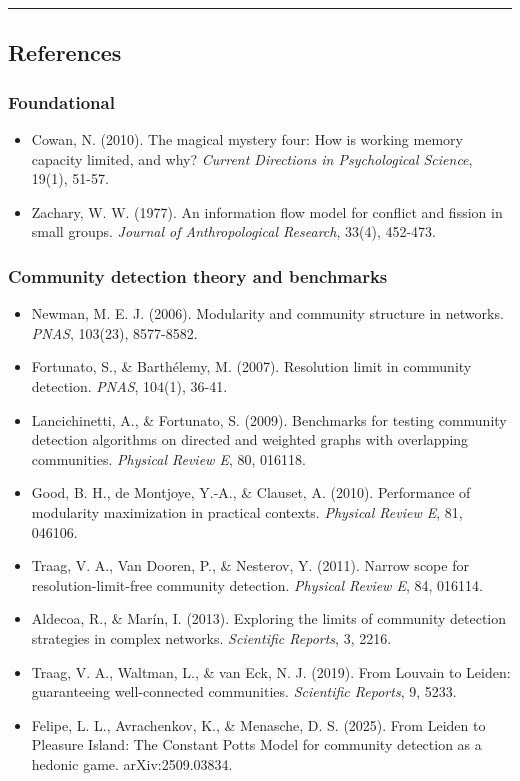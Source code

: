 \documentclass[
]{article}
\providecommand{\tightlist}{%
  \setlength{\itemsep}{0pt}\setlength{\parskip}{0pt}}
\begin{document}
\begin{center}\rule{0.5\linewidth}{0.5pt}\end{center}

\subsection{References}\label{references}

\subsubsection{Foundational}\label{foundational}

\begin{itemize}
\tightlist
\item
  Cowan, N. (2010). The magical mystery four: How is working memory
  capacity limited, and why? \emph{Current Directions in Psychological
  Science}, 19(1), 51-57.
\item
  Zachary, W. W. (1977). An information flow model for conflict and
  fission in small groups. \emph{Journal of Anthropological Research},
  33(4), 452-473.
\end{itemize}

\subsubsection{Community detection theory and
benchmarks}\label{community-detection-theory-and-benchmarks}

\begin{itemize}
\tightlist
\item
  Newman, M. E. J. (2006). Modularity and community structure in
  networks. \emph{PNAS}, 103(23), 8577-8582.
\item
  Fortunato, S., \& Barthélemy, M. (2007). Resolution limit in community
  detection. \emph{PNAS}, 104(1), 36-41.
\item
  Lancichinetti, A., \& Fortunato, S. (2009). Benchmarks for testing
  community detection algorithms on directed and weighted graphs with
  overlapping communities. \emph{Physical Review E}, 80, 016118.
\item
  Good, B. H., de Montjoye, Y.-A., \& Clauset, A. (2010). Performance of
  modularity maximization in practical contexts. \emph{Physical Review
  E}, 81, 046106.
\item
  Traag, V. A., Van Dooren, P., \& Nesterov, Y. (2011). Narrow scope for
  resolution-limit-free community detection. \emph{Physical Review E},
  84, 016114.
\item
  Aldecoa, R., \& Marín, I. (2013). Exploring the limits of community
  detection strategies in complex networks. \emph{Scientific Reports},
  3, 2216.
\item
  Traag, V. A., Waltman, L., \& van Eck, N. J. (2019). From Louvain to
  Leiden: guaranteeing well-connected communities. \emph{Scientific
  Reports}, 9, 5233.
\item
  Felipe, L. L., Avrachenkov, K., \& Menasche, D. S. (2025). From Leiden
  to Pleasure Island: The Constant Potts Model for community detection
  as a hedonic game. arXiv:2509.03834.
\end{itemize}
\end{document}
